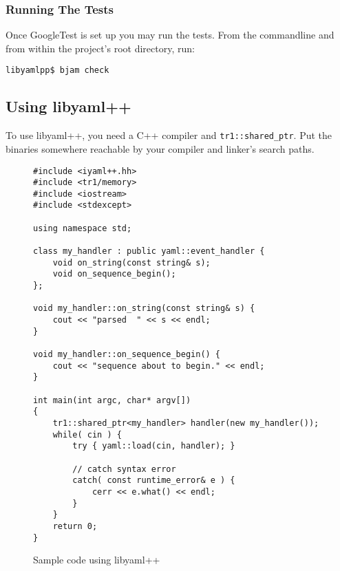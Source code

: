 \documentclass{article}
\begin{document}
\subsubsection{Running The Tests}

Once GoogleTest is set up you may run the tests.  From the commandline and from
within the project's root directory, run:

\begin{verbatim}
libyamlpp$ bjam check
\end{verbatim}

\subsection{Using libyaml++}
\label{using_libyamlpp}

To use libyaml++, you need a C++ compiler and \texttt{tr1::shared\_ptr}.  Put
the binaries somewhere reachable by your compiler and linker's search paths.

\begin{figure}
  \caption{Sample code using libyaml++}
  \begin{verbatim}
#include <iyaml++.hh>
#include <tr1/memory>
#include <iostream>
#include <stdexcept>

using namespace std;

class my_handler : public yaml::event_handler {
    void on_string(const string& s);
    void on_sequence_begin();
};

void my_handler::on_string(const string& s) {
    cout << "parsed  " << s << endl;
}

void my_handler::on_sequence_begin() {
    cout << "sequence about to begin." << endl;
}

int main(int argc, char* argv[])
{
    tr1::shared_ptr<my_handler> handler(new my_handler());
    while( cin ) {
        try { yaml::load(cin, handler); }

        // catch syntax error
        catch( const runtime_error& e ) {
            cerr << e.what() << endl;
        }
    }
    return 0;
}
\end{verbatim}
\end{figure}
\end{document}
